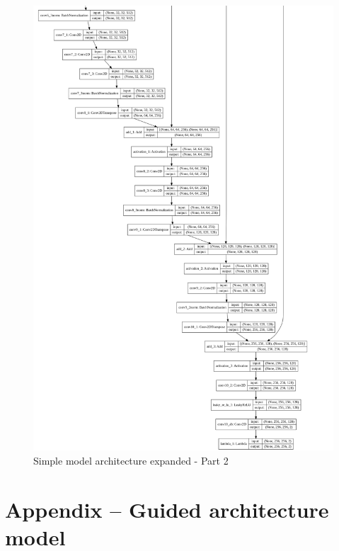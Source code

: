 \documentclass[12pt,openright,oneside,a4paper,english]{abntex2}
\begin{document}
\begin{otherlanguage}{english}
    \begin{figure}[!htb]
    \centering
    \includegraphics[height=\textheight]{model_plot/Simple2}
    \caption{Simple model architecture expanded - Part 2}
    \label{simple_plot_2}
    \end{figure}

    \chapter{Appendix -- Guided architecture model}


\end{otherlanguage}
\end{document}
